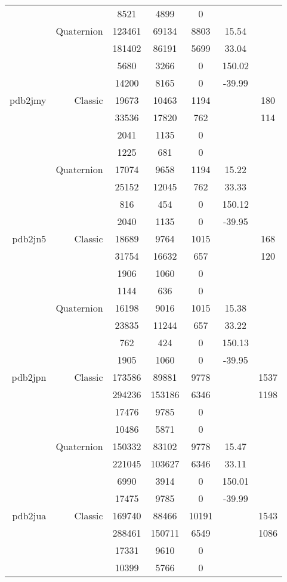 \begin{xltabular}{\textwidth}{r|rcccSc}
& & 8521 & 4899 & 0 & & \\
& Quaternion & 123461 & 69134 & 8803 & 15.54 & \\
& & 181402 & 86191 & 5699 & 33.04 & \\
& & 5680 & 3266 & 0 & 150.02 & \\
& & 14200 & 8165 & 0 & -39.99 & \\ \addlinespace
pdb2jmy & Classic & 19673 & 10463 & 1194 & & 180 \\
& & 33536 & 17820 & 762 & & 114 \\
& & 2041 & 1135 & 0 & & \\
& & 1225 & 681 & 0 & & \\
& Quaternion & 17074 & 9658 & 1194 & 15.22 & \\
& & 25152 & 12045 & 762 & 33.33 & \\
& & 816 & 454 & 0 & 150.12 & \\
& & 2040 & 1135 & 0 & -39.95 & \\ \addlinespace
pdb2jn5 & Classic & 18689 & 9764 & 1015 & & 168 \\
& & 31754 & 16632 & 657 & & 120 \\
& & 1906 & 1060 & 0 & & \\
& & 1144 & 636 & 0 & & \\
& Quaternion & 16198 & 9016 & 1015 & 15.38 & \\
& & 23835 & 11244 & 657 & 33.22 & \\
& & 762 & 424 & 0 & 150.13 & \\
& & 1905 & 1060 & 0 & -39.95 & \\ \addlinespace
pdb2jpn & Classic & 173586 & 89881 & 9778 & & 1537 \\
& & 294236 & 153186 & 6346 & & 1198 \\
& & 17476 & 9785 & 0 & & \\
& & 10486 & 5871 & 0 & & \\
& Quaternion & 150332 & 83102 & 9778 & 15.47 & \\
& & 221045 & 103627 & 6346 & 33.11 & \\
& & 6990 & 3914 & 0 & 150.01 & \\
& & 17475 & 9785 & 0 & -39.99 & \\ \addlinespace
pdb2jua & Classic & 169740 & 88466 & 10191 & & 1543 \\
& & 288461 & 150711 & 6549 & & 1086 \\
& & 17331 & 9610 & 0 & & \\
& & 10399 & 5766 & 0 & & \\

\end{xltabular}
